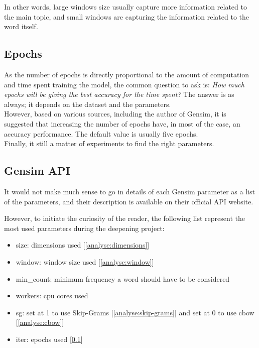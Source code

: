 In other words, large windows size usually capture more information related to the main topic, and small windows are capturing the information related to the word itself.


\subsection{Epochs}
\label{analyse:epochs}
As the number of epochs is directly proportional to the amount of computation and time spent training the model, the common question to ask is: \textit{How much epochs will be giving the best accuracy for the time spent?} The answer is as always; it depends on the dataset and the parameters. \\

However, based on various sources, including the author of Gensim\cite{article:word2vec-epochs}, it is suggested that increasing the number of epochs have, in most of the case, an accuracy performance. The default value is usually five epochs.\\

Finally, it still a matter of experiments to find the right parameters.


\subsection{Gensim API}
It would not make much sense to go in details of each Gensim parameter as a list of the parameters, and their description is available on their official API website\cite{article:gensim-api}.

However, to initiate the curiosity of the reader, the following list represent the most used parameters during the deepening project:

\begin{itemize}
    \setlength\itemsep{0em}
    \item size: dimensions used [\ref{analyse:dimensions}]
    \item window: window size used [\ref{analyse:window}]
    \item min\_count: minimum frequency a word should have to be considered
    \item workers: cpu cores used
    \item sg: set at 1 to use Skip-Grams [\ref{analyse:skip-grams}] and set at 0 to use \gls{cbow} [\ref{analyse:cbow}]
    \item iter: epochs used [\ref{analyse:epochs}]
\end{itemize}


